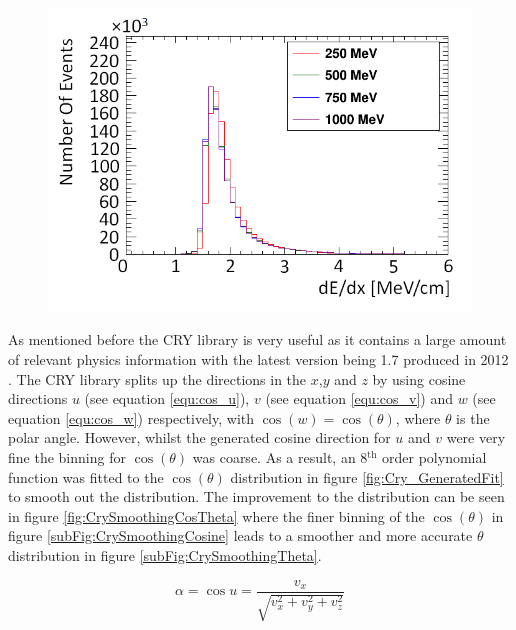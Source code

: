 \begin{figure}[!h]
 \centering
 \includegraphics[width=0.5\linewidth]{Chapter4/Figs/Raster/year1Plots/muons_per_mev_cmMedText.png}
 \label{fig:mev_per_cm_muons}
\end{figure}

As mentioned before the CRY library is very useful as it contains a large amount of relevant physics information with the latest version being 1.7 produced in 2012 \cite{hagmann2012cosmicCry}. The CRY library splits up the directions in the $x$,$y$ and $z$ by using cosine directions $u$ (see equation \ref{equ:cos_u}), $v$ (see equation \ref{equ:cos_v}) and $w$ (see equation \ref{equ:cos_w}) respectively, with $\cos(w) = \cos(\theta)$, where $\theta$ is the polar angle. However, whilst the generated cosine direction for $u$ and $v$ were very fine the binning for $\cos(\theta)$ was coarse. As a result, an 8$^{\textrm{th}}$ order polynomial function was fitted to the $\cos(\theta)$ distribution in figure \ref{fig:Cry_GeneratedFit} to smooth out the distribution. The improvement to the distribution can be seen in figure \ref{fig:CrySmoothingCosTheta} where the finer binning of the $\cos(\theta)$ in figure \ref{subFig:CrySmoothingCosine} leads to a smoother and more accurate $\theta$ distribution in figure \ref{subFig:CrySmoothingTheta}. 

\begin{equation}
\alpha = \cos{u} = \frac{v_x}{\sqrt{v_x^2+v_y^2+v_z^2}}
\label{equ:cos_u}
\end{equation}

